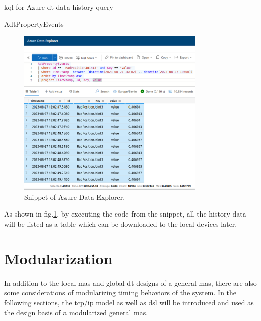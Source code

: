 \begin{algorithm}
    \caption{\gls{kql} for Azure \gls{dt} data history query}
    \label{alg: KQLCode}
    \begin{algorithmic}
        \State  AdtPropertyEvents 
    \end{algorithmic}
\end{algorithm}


\begin{figure}[htb]
    \includegraphics[width=0.8\textwidth]{figures/KQL_cut.jpg}
    
    \centering
    \caption{Snippet of Azure Data Explorer.\label{fig: KQL}}
\end{figure}

As shown in fig.\ref{fig: KQL}, by executing the code from the snippet, all the history data will be listed as a table 
which can be downloaded to the local devices later. 


\section{Modularization}\label{chap: Meth-Modular}
In addition to the local \gls{mas} and global \gls{dt} designs of a general \gls{mas}, 
there are also some considerations of modularizing timing behaviors of the 
system. In the following sections, the \gls{tcp/ip} model as well as 
\gls{dsl} will be introduced and used as the design basis of a modularized general 
\gls{mas}. 
